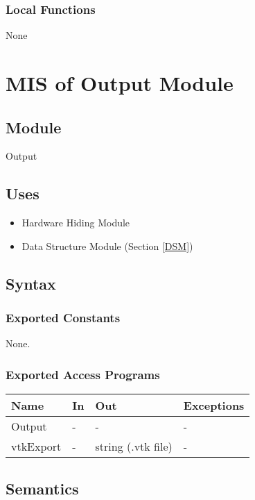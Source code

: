 \documentclass[12pt, titlepage]{article}
\begin{document}
	\subsubsection{Local Functions}
	
	None
	
	\newpage %
	\section{MIS of Output Module} \label{OM}
	
	\subsection{Module} Output
	
	\subsection{Uses} \begin{itemize} \item Hardware Hiding Module \item Data
		Structure Module (Section \ref{DSM})
		
	\end{itemize}
	
	\subsection{Syntax}
	
	\subsubsection{Exported Constants} None. \subsubsection{Exported Access
		Programs}
	
	\begin{center} \begin{tabular}{p{2cm} p{4cm} p{4cm} p{2cm}} \hline \textbf{Name}
			& \textbf{In} & \textbf{Out} & \textbf{Exceptions} \\ \hline Output& - & - & -
			\\ vtkExport & - & string (.vtk file) & - \\
			
			\hline \end{tabular} \end{center}
	
	\subsection{Semantics}
	
\end{document}
